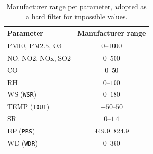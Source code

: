 \begin{table}[pos=t]
  \centering
  \caption{Manufacturer range per parameter, adopted as a hard filter for
    impossible values.}
  \label{tab:dic-fabricante}
  \small
  \begin{tabular}{lc}
    \toprule
    Parameter & Manufacturer range \\
    \midrule
    PM10, PM2.5, O3      & $0$--$1000$     \\
    NO, NO2, NOx, SO2    & $0$--$500$      \\
    CO                   & $0$--$50$       \\
    RH                   & $0$--$100$      \\
    WS (\texttt{WSR})    & $0$--$180$      \\
    TEMP (\texttt{TOUT}) & $-50$--$50$     \\
    SR                   & $0$--$1.4$      \\
    BP (\texttt{PRS})    & $449.9$--$824.9$\\
    WD (\texttt{WDR})    & $0$--$360$      \\
    \bottomrule
  \end{tabular}
\end{table}
